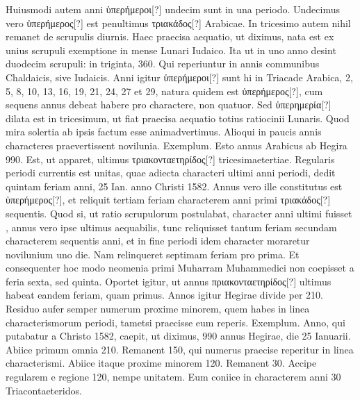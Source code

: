 %
Huiusmodi autem anni \textgreek{ὑπερήμεροι[?]}
undecim sunt in una periodo.
Undecimus vero \textgreek{ὑπερήμερος[?]} est penultimus
\textgreek{τριακάδος[?]} Arabicae.
In tricesimo
autem nihil remanet de scrupulis diurnis.
Haec praecisa aequatio, ut diximus,
nata est ex unius scrupuli exemptione
in mense Lunari Iudaico.
Ita ut in uno
anno desint duodecim scrupuli: in triginta, 360.
Qui
reperiuntur in annis communibus Chaldaicis, sive
Iudaicis.
Anni igitur \textgreek{ὑπερήμεροι[?]} sunt hi in Triacade
Arabica, 2, 5, 8, 10, 13, 16, 19, 21, 24, 27 et 29, natura
quidem est \textgreek{ὑπερήμερος[?]}, cum sequens annus debeat
habere  pro charactere, non quatuor.
Sed
\textgreek{ὑπερημερία[?]} dilata est in tricesimum, ut fiat praecisa aequatio
totius ratiocinii Lunaris.
Quod mira solertia
ab ipsis factum esse animadvertimus.
Alioqui
in paucis annis characteres praevertissent novilunia.
Exemplum.
Esto annus Arabicus ab Hegira
990.
Est, ut apparet, ultimus \textgreek{τριακονταετηρίδος[?]}
 tricesimaetertiae.
Regularis periodi currentis est unitas,
quae adiecta characteri ultimi anni periodi, dedit
quintam feriam anni, 25 Ian. %
 anno Christi 1582.
Annus vero ille constitutus
est \textgreek{ὑπερήμερος[?]}, et reliquit tertiam feriam characterem anni
primi \textgreek{τριακάδος[?]} sequentis.
Quod si, ut ratio scrupulorum postulabat,
character anni ultimi fuisset , annus vero ipse ultimus aequabilis,
tunc reliquisset tantum feriam secundam characterem sequentis
anni, et in fine periodi idem character moraretur novilunium uno die.
Nam relinqueret septimam feriam pro prima.
Et consequenter hoc modo
neomenia primi Muharram Muhammedici non coepisset a feria
sexta, sed quinta.
Oportet igitur, ut annus \textgreek{πριακονταετηρίδος[?]} ultimus
habeat eandem feriam, quam primus.
Annos igitur Hegirae divide
per 210.
Residuo aufer semper numerum proxime minorem, quem
habes in linea characterismorum periodi, tametsi praecisse eum reperis.
Exemplum.
Anno, qui putabatur a Christo 1582, caepit, ut diximus,
990 annus Hegirae, die 25 Ianuarii.
Abiice primum omnia 210.
Remanent 150, qui numerus praecise reperitur in linea characterismi.
Abiice itaque proxime minorem 120.
Remanent 30.
Accipe regularem
e regione 120, nempe unitatem.
Eum coniice in characterem
anni 30 Triacontaeteridos.
